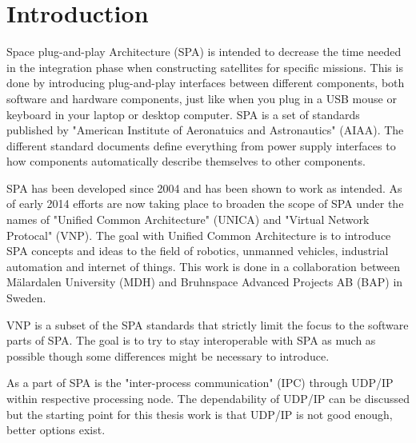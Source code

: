 \chapter{Introduction}
Space plug-and-play Architecture (SPA) is intended to decrease the time needed
in the integration phase when constructing satellites for specific missions.
This is done by introducing plug-and-play interfaces between different
components, both software and hardware components, just like when you plug in a
USB mouse or keyboard in your laptop or desktop computer.  SPA is a set of
standards published by "American Institute of Aeronatuics and Astronautics"
(AIAA). The different standard documents define everything from power supply
interfaces to how components automatically describe themselves to other
components.


SPA has been developed since 2004 and has been shown to work as intended. As of
early 2014 efforts are now taking place to broaden the scope of SPA under the
names of "Unified Common Architecture" (UNICA) and "Virtual Network Protocal"
(VNP). The goal with Unified Common Architecture is to introduce SPA concepts
and ideas to the field of robotics, unmanned vehicles, industrial automation
and internet of things. This work is done in a collaboration between
M\"{a}lardalen University (MDH) and Bruhnspace Advanced Projects AB (BAP) in
Sweden.


VNP is a subset of the SPA standards that strictly limit the focus to the
software parts of SPA. The goal is to try to stay interoperable with SPA as
much as possible though some differences might be necessary to introduce.

As a part of SPA is the "inter-process communication" (IPC)
through UDP/IP within respective processing node. The dependability of
UDP/IP can be discussed but the starting point for this thesis work is that
UDP/IP is not good enough, better options exist.

